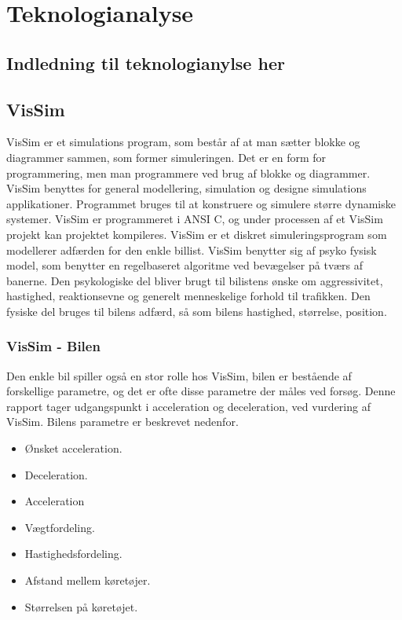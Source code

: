 \chapter{Teknologianalyse}\label{Teknologianalyse}

\section{Indledning til teknologianylse her}

\section{VisSim}
VisSim er et simulations program, som består af at man sætter blokke og diagrammer sammen, som former simuleringen. Det er en form for programmering, men man programmere ved brug af blokke og diagrammer. VisSim benyttes for general modellering, simulation og designe simulations applikationer. Programmet bruges til at konstruere og simulere større dynamiske systemer. VisSim er programmeret i ANSI C, og under processen af et VisSim projekt kan projektet kompileres.  
VisSim er et diskret simuleringsprogram som modellerer adfærden for den enkle billist. VisSim benytter sig af psyko fysisk model, som benytter en regelbaseret algoritme ved bevægelser på tværs af banerne. Den psykologiske del bliver brugt til bilistens ønske om aggressivitet, hastighed, reaktionsevne og generelt menneskelige forhold til trafikken. Den fysiske del bruges til bilens adfærd, så som bilens hastighed, størrelse, position. 

\subsection{VisSim - Bilen}
Den enkle bil spiller også en stor rolle hos VisSim, bilen er bestående af forskellige parametre, og det er ofte disse parametre der måles ved forsøg. Denne rapport tager udgangspunkt i acceleration og deceleration, ved vurdering af VisSim. Bilens parametre er beskrevet nedenfor.

\begin{itemize}
\item Ønsket acceleration.
\item Deceleration.
\item Acceleration
\item Vægtfordeling.
\item Hastighedsfordeling.
\item Afstand mellem køretøjer.
\item Størrelsen på køretøjet.
\end{itemize}

